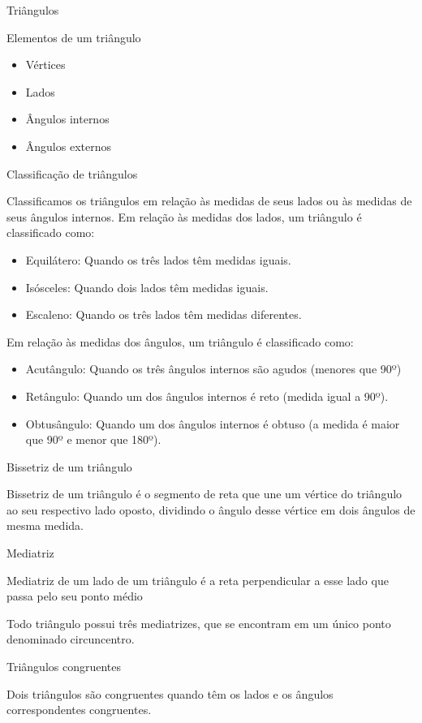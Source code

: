 Triângulos

Elementos de um triângulo

\begin{itemize}
\item
  Vértices
\item
  Lados
\item
  Ângulos internos
\item
  Ângulos externos
\end{itemize}

Classificação de triângulos

Classificamos os triângulos em relação às medidas de seus lados ou às
medidas de seus ângulos internos. Em relação às medidas dos lados, um
triângulo é classificado como:

\begin{itemize}
\item
  Equilátero: Quando os três lados têm medidas iguais.
\item
  Isósceles: Quando dois lados têm medidas iguais.
\item
  Escaleno: Quando os três lados têm medidas diferentes.
\end{itemize}

Em relação às medidas dos ângulos, um triângulo é classificado como:

\begin{itemize}
\item
  Acutângulo: Quando os três ângulos internos são agudos (menores que
  90º)
\item
  Retângulo: Quando um dos ângulos internos é reto (medida igual a 90º).
\item
  Obtusângulo: Quando um dos ângulos internos é obtuso (a medida é maior
  que 90º e menor que 180º).
\end{itemize}

Bissetriz de um triângulo

Bissetriz de um triângulo é o segmento de reta que une um vértice do
triângulo ao seu respectivo lado oposto, dividindo o ângulo desse
vértice em dois ângulos de mesma medida.

Mediatriz

Mediatriz de um lado de um triângulo é a reta perpendicular a esse lado
que passa pelo seu ponto médio

Todo triângulo possui três mediatrizes, que se encontram em um único
ponto denominado circuncentro.

Triângulos congruentes

Dois triângulos são congruentes quando têm os lados e os ângulos
correspondentes congruentes.

